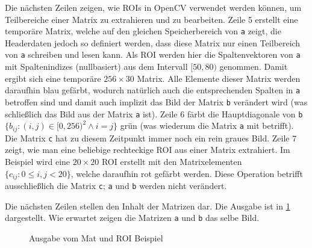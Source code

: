 \documentclass{whswinvcbook}
\begin{document}
Die nächsten Zeilen zeigen, wie ROIs in OpenCV verwendet werden können, um Teilbereiche einer Matrix zu extrahieren und zu bearbeiten. Zeile 5 erstellt eine temporäre Matrix, welche auf den gleichen Speicherbereich von \texttt{a} zeigt, die Headerdaten jedoch so definiert werden, dass diese Matrix nur einen Teilbereich von \texttt{a} schreiben und lesen kann. Als ROI werden hier die Spaltenvektoren von \texttt{a} mit Spaltenindizes (nullbasiert) aus dem Intervall $[50,80)$ genommen. Damit ergibt sich eine temporäre $256\times30$ Matrix. Alle Elemente dieser Matrix werden daraufhin blau gefärbt, wodurch natürlich auch die entsprechenden Spalten in \texttt{a} betroffen sind und damit auch implizit das Bild der Matrix \texttt{b} verändert wird (was schließlich das Bild aus der Matrix \texttt{a} ist). Zeile 6 färbt die Hauptdiagonale von \texttt{b} $\{b_{ij}:(i,j)\in[0,256)^2\land i=j\}$ grün (was wiederum die Matrix \texttt{a} mit betrifft). Die Matrix \texttt{c} hat zu diesem Zeitpunkt immer noch ein rein graues Bild. Zeile 7 zeigt, wie man eine beliebige rechteckige ROI aus einer Matrix extrahiert. Im Beispiel wird eine $20\times20$ ROI erstellt mit den Matrixelementen $\{c_{ij}:0\leq i,j<20\}$, welche daraufhin rot gefärbt werden. Diese Operation betrifft ausschließlich die Matrix \texttt{c}; \texttt{a} und \texttt{b} werden nicht verändert.

Die nächsten Zeilen stellen den Inhalt der Matrizen dar. Die Ausgabe ist in \ref{fig-opencv-mat} dargestellt. Wie erwartet zeigen die Matrizen \texttt{a} und \texttt{b} das selbe Bild.
\begin{figure}[H]
    \centering
    \quad\quad
    \quad\quad
    \caption{Ausgabe vom Mat und ROI Beispiel}
    \label{fig-opencv-mat}
\end{figure}
\end{document}
